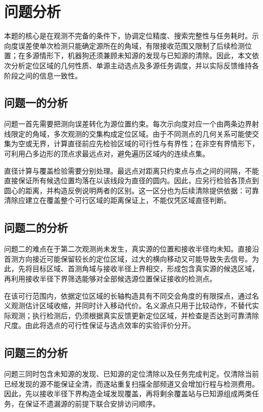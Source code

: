 \section{问题分析}\label{sec:problem-analysis}

本题的核心是在观测不完备的条件下，协调定位精度、搜索完整性与任务耗时。示向度误差使单次检测只能确定源所在的角域，有限接收范围又限制了后续检测位置；在多源情形下，机器狗还须兼顾未知源的发现与已知源的清除。因此，本文依次分析定位区域的几何性质、单源主动选点及多源任务调度，并以实际反馈维持各阶段之间的信息一致性。

\subsection{问题一的分析}

问题一首先需要把测向误差转化为源位置约束。每次示向度对应一个由两条边界射线限定的角域，多次观测的交集构成定位区域。由于不同测点的几何关系可能使交集为空或无界，计算直径前应先检验区域的可行性与有界性；在非空有界情形下，可利用凸多边形的顶点求最远点对，避免遍历区域内的连续点集。

直径计算与覆盖检验需要分别处理。最远点对距离只约束点与点之间的间隔，不能直接保证所有候选位置均落在以该线段为直径的圆内。因此，应另行检验各顶点到圆心的距离，并构造反例说明两者的区别。这一区分也为后续清除提供依据：可靠清除应建立在覆盖整个可行区域的距离保证上，不能仅凭区域直径判断。

\subsection{问题二的分析}

问题二的难点在于第二次观测尚未发生，真实源的位置和接收半径均未知。直接沿首测方向接近可能保留较长的定位区域，过大的横向移动又可能导致失去信号。为此，先将目标区域、首测角域与接收半径上界相交，形成包含真实源的候选区域，再利用接收半径下界筛选能够对全部候选源位置保证接收的检测点。

在该可行范围内，依据定位区域的长轴构造具有不同交会角度的有限探点，通过名义观测估计区域收缩，并同时计入移动代价。名义源点只用于比较动作，不替代实际观测；执行检测后，仍须根据真实反馈更新定位区域，并检查是否达到可靠清除尺度。由此将选点的可行性保证与选点效率的实验评价分开。

\subsection{问题三的分析}

问题三同时包含未知源的发现、已知源的定位清除以及任务完成判定。仅清除当前已经发现的源不能保证全清，而逐站重复扫描全部频道又会增加行程与检测费用。因此，先以接收半径下界构造全域发现覆盖，再将剩余覆盖站与已知源组成两类任务，在保证不遗漏源的前提下联合安排访问顺序。

